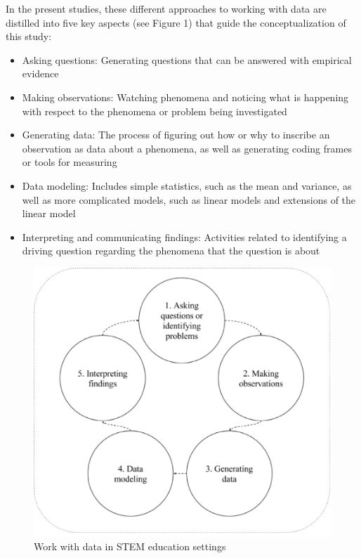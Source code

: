 \documentclass[]{book}
\providecommand{\tightlist}{%
  \setlength{\itemsep}{0pt}\setlength{\parskip}{0pt}}
\theoremstyle{definition}
\theoremstyle{definition}
\theoremstyle{definition}
\theoremstyle{remark}
\begin{document}
In the present studies, these different approaches to working with data
are distilled into five key aspects (see Figure 1) that guide the
conceptualization of this study:

\begin{itemize}
\tightlist
\item
  Asking questions: Generating questions that can be answered with
  empirical evidence
\item
  Making observations: Watching phenomena and noticing what is happening
  with respect to the phenomena or problem being investigated
\item
  Generating data: The process of figuring out how or why to inscribe an
  observation as data about a phenomena, as well as generating coding
  frames or tools for measuring
\item
  Data modeling: Includes simple statistics, such as the mean and
  variance, as well as more complicated models, such as linear models
  and extensions of the linear model
\item
  Interpreting and communicating findings: Activities related to
  identifying a driving question regarding the phenomena that the
  question is about
\end{itemize}

\begin{figure}

{\centering \includegraphics[width=0.8\linewidth]{images/figure1} 

}

\caption{Work with data in STEM education settings}\label{fig:unnamed-chunk-1}
\end{figure}
\end{document}
